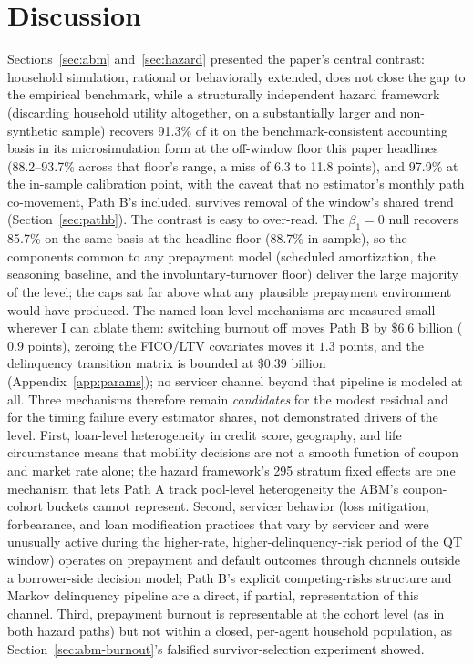 \documentclass[12pt]{article}
\begin{document}
\section{Discussion}\label{sec:discussion}

Sections~\ref{sec:abm} and~\ref{sec:hazard} presented the paper's central contrast: household simulation, rational or behaviorally extended, does not close the gap to the empirical benchmark, while a structurally independent hazard framework (discarding household utility altogether, on a substantially larger and non-synthetic sample) recovers 91.3\% of it on the benchmark-consistent accounting basis in its microsimulation form at the off-window floor this paper headlines (88.2--93.7\% across that floor's range, a miss of 6.3 to 11.8 points), and 97.9\% at the in-sample calibration point, with the caveat that no estimator's monthly path co-movement, Path B's included, survives removal of the window's shared trend (Section~\ref{sec:pathb}). The contrast is easy to over-read. The $\beta_1 = 0$ null recovers 85.7\% on the same basis at the headline floor (88.7\% in-sample), so the components common to any prepayment model (scheduled amortization, the seasoning baseline, and the involuntary-turnover floor) deliver the large majority of the level; the caps sat far above what any plausible prepayment environment would have produced. The named loan-level mechanisms are measured small wherever I can ablate them: switching burnout off moves Path B by \$6.6 billion ($0.9$ points), zeroing the FICO/LTV covariates moves it $1.3$ points, and the delinquency transition matrix is bounded at \$0.39 billion (Appendix~\ref{app:params}); no servicer channel beyond that pipeline is modeled at all. Three mechanisms therefore remain \emph{candidates} for the modest residual and for the timing failure every estimator shares, not demonstrated drivers of the level. First, loan-level heterogeneity in credit score, geography, and life circumstance means that mobility decisions are not a smooth function of coupon and market rate alone; the hazard framework's 295 stratum fixed effects are one mechanism that lets Path A track pool-level heterogeneity the ABM's coupon-cohort buckets cannot represent. Second, servicer behavior (loss mitigation, forbearance, and loan modification practices that vary by servicer and were unusually active during the higher-rate, higher-delinquency-risk period of the QT window) operates on prepayment and default outcomes through channels outside a borrower-side decision model; Path B's explicit competing-risks structure and Markov delinquency pipeline are a direct, if partial, representation of this channel. Third, prepayment burnout is representable at the cohort level (as in both hazard paths) but not within a closed, per-agent household population, as Section~\ref{sec:abm-burnout}'s falsified survivor-selection experiment showed.
\end{document}
